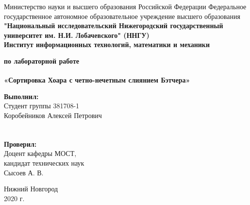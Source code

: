 \documentclass{report}
\begin{document}
\begin{titlepage}

\begin{center}
   
Министерство науки и высшего образования Российской Федерации
{Федеральное государственное автономное образовательное учреждение высшего образования} \\
\textbf{"Национальный исследовательский Нижегородский государственный университет им. Н.И. Лобачевского" (ННГУ)} \\
\textbf{Институт информационных технологий, математики и механики}

\vspace{\fill}

\textbf{ по лабораторной работе \\}
\textbf{\large\\ «Сортировка Хоара с четно-нечетным слиянием Бэтчера»}

\vspace{\fill}

\hfill\parbox{8cm}{
\hspace*{5cm}\hspace*{-5cm}\textbf{Выполнил:} \\ Студент группы 381708-1 \\ Коробейников Алексей Петрович \\ \\ \\
\hspace*{5cm}\hspace*{-5cm}\textbf{Проверил:}\\ Доцент кафедры МОСТ, \\ кандидат технических наук \\ Сысоев А. В.
}

\vspace{\fill}

Нижний Новгород \\ 2020 г.
\end{center}

\end{titlepage}

\setcounter{page}{2}
\setlength{\cftsecindent}{0em}
\setlength{\cftsubsecindent}{1.25em}
\setlength{\cftsubsubsecindent}{2.5em}
\setlength{\cftsubsubsecnumwidth}{1.25em}
\tableofcontents


\newpage
\end{document}
